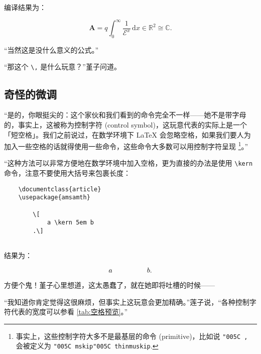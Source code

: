 {\begin{codeing}
\begin{lstlisting}
\end{lstlisting}
\end{codeing}

编译结果为：

\begin{codeing}

    \[
        \boldsymbol{A} = q \int_0^\infty \frac{1}{\mathcal E^x}\,\mathrm{d} x \in \mathbb{R}^2  \cong \mathbb{C}
        .\]

\end{codeing}

“当然这是没什么意义的公式。”

“那这个 \verb"\," 是什么玩意？”堇子问道。


\subsection{奇怪的微调}

“是的，你眼挺尖的：这个家伙和我们看到的命令完全不一样——她不是带字母的，事实上，这被称为控制字符 (control symbol)，这玩意代表的实际上是一个「短空格」。我们之前说过，在数学环境下 \LaTeX{} 会忽略空格，如果我们要人为加入一些空格的话就得使用一些命令，这些命令大多数可以用控制字符呈现 \footnote{事实上，这些控制字符大多不是最基层的命令 (primitive)，比如说 \texttt{\char"005C ,} 会被定义为 \texttt{\char"005C mskip\char"005C thinmuskip}.}。”


“这种方法可以非常方便地在数学环境中加入空格，更为直接的办法是使用 \verb"\kern" 命令，注意不要使用大括号来包裹长度：


\begin{codeing}
    \begin{lstlisting}
    \documentclass{article}
    \usepackage{amsamth}
    
        \[
            a \kern 5em b
        .\]
    
\end{lstlisting}
\end{codeing}

结果为：

\begin{codeing}
    \[
        a   \kern 5em b
        .\]
\end{codeing}
方便个鬼！堇子心里想道，这太愚蠢了，就在她即将吐槽的时候——

“我知道你肯定觉得这很麻烦，但事实上这玩意会更加精确。”莲子说，“各种控制字符代表的宽度可以参看 \autoref{tab:空格预览}。”


}
